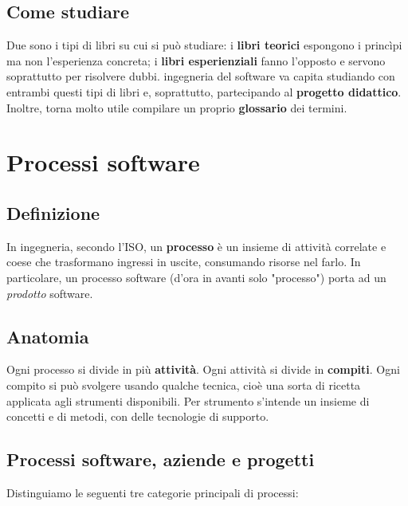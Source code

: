 \documentclass[a4paper]{article}
\begin{document}
		
	\subsection{Come studiare}

		
Due sono i tipi di libri su cui si può studiare: i \textbf{libri teorici} espongono i princìpi ma non l'esperienza concreta; i \textbf{libri esperienziali} fanno l'opposto e servono soprattutto per risolvere dubbi. ingegneria del software va capita studiando con entrambi questi tipi di libri e, soprattutto, partecipando al \textbf{progetto didattico}. Inoltre, torna molto utile compilare un proprio \textbf{glossario} dei termini.
	


		
	\section{Processi software}


		
	\subsection{Definizione}

		
In ingegneria, secondo l'ISO, un \textbf{processo} è un insieme di attività correlate e coese che trasformano ingressi in uscite, consumando risorse nel farlo. In particolare, un processo software (d'ora in avanti solo "processo") porta ad un \emph{prodotto} software.

		
	\subsection{Anatomia}

		
Ogni processo si divide in più \textbf{attività}. Ogni attività si divide in \textbf{compiti}. Ogni compito si può svolgere usando qualche tecnica, cioè una sorta di ricetta applicata agli strumenti disponibili. Per strumento s'intende un insieme di concetti e di metodi, con delle tecnologie di supporto.

		
	\subsection{Processi software, aziende e progetti}

		
Distinguiamo le seguenti tre categorie principali di processi:
		
\end{document}
